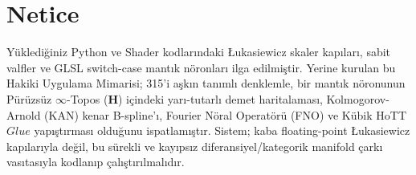 \documentclass[11pt, a4paper]{article}
\begin{document}
\section{Netice}

Yüklediğiniz Python ve Shader kodlarındaki Łukasiewicz skaler kapıları, sabit valfler ve GLSL switch-case mantık nöronları ilga edilmiştir. Yerine kurulan bu Hakiki Uygulama Mimarisi; 315'i aşkın tanımlı denklemle, bir mantık nöronunun Pürüzsüz $\infty$-Topos ($\mathbf{H}$) içindeki yarı-tutarlı demet haritalaması, Kolmogorov-Arnold (KAN) kenar B-spline'ı, Fourier Nöral Operatörü (FNO) ve Kübik HoTT $Glue$ yapıştırması olduğunu ispatlamıştır. Sistem; kaba floating-point Łukasiewicz kapılarıyla değil, bu sürekli ve kayıpsız diferansiyel/kategorik manifold çarkı vasıtasıyla kodlanıp çalıştırılmalıdır.
\end{document}
